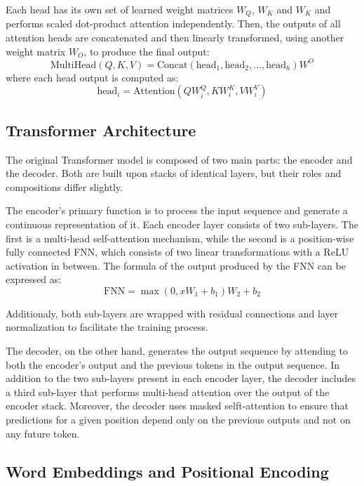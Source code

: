 \documentclass[11pt,english,listoffigures,listoftables]{tfgetsinf}
\begin{document}
Each head has its own set of learned weight matrices \(W_Q\), \(W_K\) and \(W_K\) and performs scaled dot-product attention independently. Then, the outputs of all attention heads are concatenated and then linearly transformed, using another weight matrix \(W_O\), to produce the final output:
%
\begin{equation}
    \text{MultiHead}(Q, K, V) = \text{Concat}(\text{head}_1, \text{head}_2, \ldots, \text{head}_h)W^O
\end{equation}
%
where each head output is computed as:
%
\begin{equation}
    \text{head}_i = \text{Attention}(QW_i^Q, KW_i^K, VW_i^V)
\end{equation}

\subsection{Transformer Architecture}
\label{subseq:transformer_arch}

The original Transformer model is composed of two main parts: the encoder and the decoder. Both are built upon stacks of identical layers, but their roles and compositions differ slightly.

The encoder's primary function is to process the input sequence and generate a continuous representation of it. Each encoder layer consists of two sub-layers. The first is a multi-head self-attention mechanism, while the second is a position-wise fully connected FNN, which consists of two linear transformations with a ReLU activation in between. The formula of the output produced by the FNN can be expressed as:
%
\begin{equation}
    \text{FNN}= \max(0, xW_1 + b_1)W_2 + b_2
\end{equation}

Additionaly, both sub-layers are wrapped with residual connections and layer normalization to facilitate the training process.

The decoder, on the other hand, generates the output sequence by attending to both the encoder's output and the previous tokens in the output sequence. In addition to the two sub-layers present in each encoder layer, the decoder includes a third sub-layer that performs multi-head attention over the output of the encoder stack. Moreover, the decoder uses masked selft-attention to ensure that predictions for a given position depend only on the previous outputs and not on any future token.

\subsection{Word Embeddings and Positional Encoding}
\end{document}
